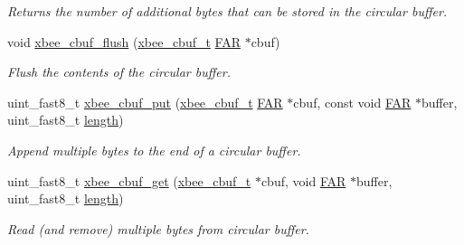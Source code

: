 \begin{DoxyCompactItemize}
\begin{DoxyCompactList}\small\item\em Returns the number of additional bytes that can be stored in the circular buffer. \end{DoxyCompactList}\item 
void \hyperlink{group__util__cbuf_gaf0cf797a0e4ee8c9e518e0d8b9554b10}{xbee\+\_\+cbuf\+\_\+flush} (\hyperlink{structxbee__cbuf__t}{xbee\+\_\+cbuf\+\_\+t} \hyperlink{group__hal_gaef060b3456fdcc093a7210a762d5f2ed}{F\+AR} $\ast$cbuf)
\begin{DoxyCompactList}\small\item\em Flush the contents of the circular buffer. \end{DoxyCompactList}\item 
uint\+\_\+fast8\+\_\+t \hyperlink{group__util__cbuf_gad3d314f23c6c7c6fc31c9b65ce61eee1}{xbee\+\_\+cbuf\+\_\+put} (\hyperlink{structxbee__cbuf__t}{xbee\+\_\+cbuf\+\_\+t} \hyperlink{group__hal_gaef060b3456fdcc093a7210a762d5f2ed}{F\+AR} $\ast$cbuf, const void \hyperlink{group__hal_gaef060b3456fdcc093a7210a762d5f2ed}{F\+AR} $\ast$buffer, uint\+\_\+fast8\+\_\+t \hyperlink{group__zdo_gab2b3adeb2a67e656ff030b56727fd0ac}{length})
\begin{DoxyCompactList}\small\item\em Append multiple bytes to the end of a circular buffer. \end{DoxyCompactList}\item 
uint\+\_\+fast8\+\_\+t \hyperlink{group__util__cbuf_ga98b2d80239319b2a9875772c28a7630a}{xbee\+\_\+cbuf\+\_\+get} (\hyperlink{structxbee__cbuf__t}{xbee\+\_\+cbuf\+\_\+t} $\ast$cbuf, void \hyperlink{group__hal_gaef060b3456fdcc093a7210a762d5f2ed}{F\+AR} $\ast$buffer, uint\+\_\+fast8\+\_\+t \hyperlink{group__zdo_gab2b3adeb2a67e656ff030b56727fd0ac}{length})
\begin{DoxyCompactList}\small\item\em Read (and remove) multiple bytes from circular buffer. \end{DoxyCompactList}\end{DoxyCompactItemize}
